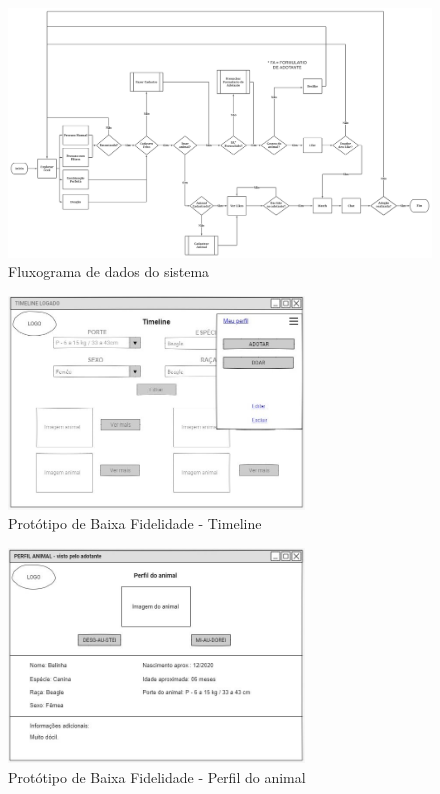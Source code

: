 \begin{figure}
    \centering
	\includegraphics[width=1\textwidth]{imagens/fluxograma.png}
	\caption{\label{fig_diag_virado}Fluxograma de dados do sistema}
\end{figure}

\begin{figure}[htb]
    \centering
	\includegraphics[width=0.7\textwidth]{imagens/timeline.jpeg}
	\caption{\label{fig_timeline}Protótipo de Baixa Fidelidade - Timeline}
\end{figure}

\begin{figure}[htb]
    \centering
	\includegraphics[width=0.7\textwidth]{imagens/perfil_animal.jpeg}
	\caption{\label{fig_perfil}Protótipo de Baixa Fidelidade - Perfil do animal}
\end{figure}

